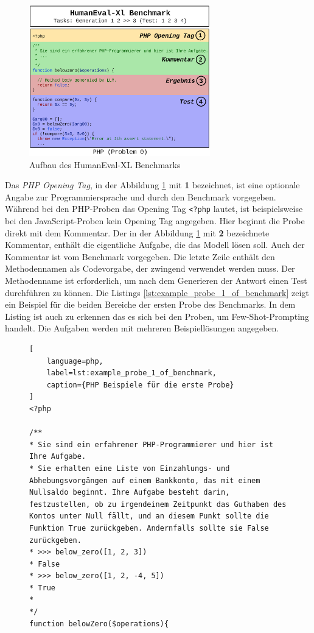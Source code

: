 \begin{figure}[!ht]
	\includegraphics[width=0.7\textwidth]{content/chapter_concept_design/images/code_generation_humaneval_x.eps}
	\centering
	\caption{Aufbau des HumanEval-XL Benchmarks}
	\label{img:code_generation_humaneval}
\end{figure}

Das \textit{PHP Opening Tag}, in der Abbildung \ref{img:code_generation_humaneval} mit \textbf{1} bezeichnet, ist eine optionale Angabe zur Programmiersprache und durch den Benchmark vorgegeben. Während bei den PHP-Proben das Opening Tag \texttt{<?php} lautet, ist beispielsweise bei den JavaScript-Proben kein Opening Tag angegeben. Hier beginnt die Probe direkt mit dem Kommentar. Der in der Abbildung \ref{img:code_generation_humaneval} mit \textbf{2} bezeichnete Kommentar, enthält die eigentliche Aufgabe, die das Modell lösen soll. Auch der Kommentar ist vom Benchmark vorgegeben. Die letzte Zeile enthält den Methodennamen als Codevorgabe, der zwingend verwendet werden muss. Der Methodenname ist erforderlich, um nach dem Generieren der Antwort einen Test durchführen zu können. Die Listings \ref{lst:example_probe_1_of_benchmark} zeigt ein Beispiel für die beiden Bereiche der ersten Probe des Benchmarks. In dem Listing ist auch zu erkennen das es sich bei den Proben, um Few-Shot-Prompting handelt. Die Aufgaben werden mit mehreren Beispiellösungen angegeben.\vspace{0.2cm}

\begin{figure}[!ht]
\begin{lstlisting}[
	language=php,
	label=lst:example_probe_1_of_benchmark,
	caption={PHP Beispiele für die erste Probe}
]
<?php

/**
* Sie sind ein erfahrener PHP-Programmierer und hier ist Ihre Aufgabe.
* Sie erhalten eine Liste von Einzahlungs- und Abhebungsvorgängen auf einem Bankkonto, das mit einem Nullsaldo beginnt. Ihre Aufgabe besteht darin, festzustellen, ob zu irgendeinem Zeitpunkt das Guthaben des Kontos unter Null fällt, und an diesem Punkt sollte die Funktion True zurückgeben. Andernfalls sollte sie False zurückgeben.
* >>> below_zero([1, 2, 3])
* False
* >>> below_zero([1, 2, -4, 5])
* True
*
*/
function belowZero($operations){
\end{lstlisting}
\end{figure}
	

